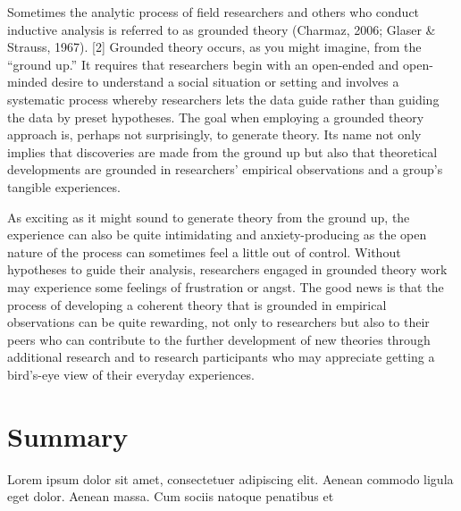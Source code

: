 Sometimes the analytic process of field researchers and others who conduct inductive analysis is referred to as grounded theory (Charmaz, 2006; Glaser \& Strauss, 1967). [2] Grounded theory occurs, as you might imagine, from the ``ground up.'' It requires that researchers begin with an open-ended and open-minded desire to understand a social situation or setting and involves a systematic process whereby researchers lets the data guide rather than guiding the data by preset hypotheses. The goal when employing a grounded theory approach is, perhaps not surprisingly, to generate theory. Its name not only implies that discoveries are made from the ground up but also that theoretical developments are grounded in researchers' empirical observations and a group’s tangible experiences.

As exciting as it might sound to generate theory from the ground up, the experience can also be quite intimidating and anxiety-producing as the open nature of the process can sometimes feel a little out of control. Without hypotheses to guide their analysis, researchers engaged in grounded theory work may experience some feelings of frustration or angst. The good news is that the process of developing a coherent theory that is grounded in empirical observations can be quite rewarding, not only to researchers but also to their peers who can contribute to the further development of new theories through additional research and to research participants who may appreciate getting a bird’s-eye view of their everyday experiences.

\section{Summary}\label{ch11:summary}

Lorem ipsum dolor sit amet, consectetuer adipiscing elit. Aenean commodo ligula eget dolor. Aenean massa. Cum sociis natoque penatibus et
